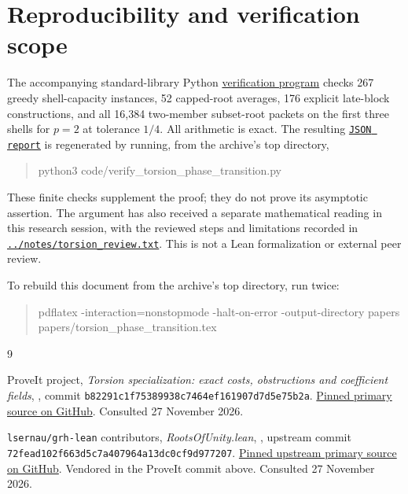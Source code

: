 \documentclass[11pt]{article}
\theoremstyle{remark}\newtheorem{remark}[theorem]{Remark}
\begin{document}
\section{Reproducibility and verification scope}
The accompanying standard-library Python
\href{../code/verify_torsion_phase_transition.py}{verification program}
checks 267 greedy shell-capacity instances, 52 capped-root averages, 176 explicit
late-block constructions, and all 16,384 two-member subset-root packets on the first
three shells for $p=2$ at tolerance $1/4$. All arithmetic is exact. The resulting
\href{../results/torsion_phase_transition_checks.json}{\texttt{JSON report}}
is regenerated by running, from the archive's top directory,
\begin{quote}\small\ttfamily
python3 code/verify\_torsion\_phase\_transition.py
\end{quote}
These finite checks supplement the proof; they do not prove its asymptotic assertion.
The argument has also received a separate mathematical reading in this research session,
with the reviewed steps and limitations recorded in
\href{../notes/torsion_review.txt}{\texttt{../notes/torsion\_review.txt}}.
This is not a Lean formalization or external peer review.

To rebuild this document from the archive's top directory, run twice:
\begin{quote}\small\ttfamily\raggedright
pdflatex -interaction=nonstopmode -halt-on-error -output-directory papers
papers/torsion\_phase\_transition.tex
\end{quote}

\begin{thebibliography}{9}\raggedright
{}
ProveIt project,
\emph{Torsion specialization: exact costs, obstructions and coefficient fields},
,
commit \texttt{b82291c1f75389938c7464ef161907d7d5e75b2a}.
\href{https://github.com/VladimirReshetnikov/ProveIt/blob/b82291c1f75389938c7464ef161907d7d5e75b2a/Analysis/GeneralizedRiemannHypothesis/Article/sections/cost.tex}{Pinned primary source on GitHub}.
Consulted 27 November 2026.

\texttt{lsernau/grh-lean} contributors,
\emph{RootsOfUnity.lean},
,
upstream commit \texttt{72fead102f663d5c7a407964a13dc0cf9d977207}.
\href{https://github.com/lsernau/grh-lean/blob/72fead102f663d5c7a407964a13dc0cf9d977207/grh/src/New/Congruences/Selmer/RootsOfUnity.lean}{Pinned upstream primary source on GitHub}.
Vendored in the ProveIt commit above. Consulted 27 November 2026.
\end{thebibliography}
\end{document}
